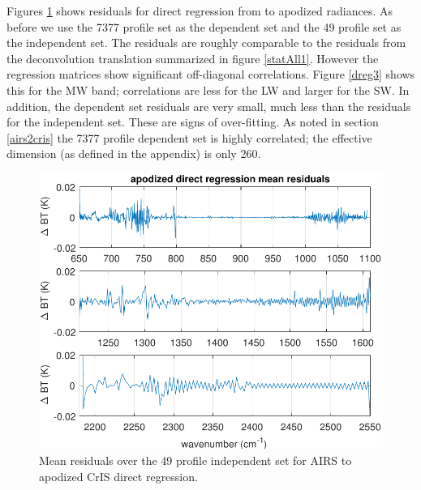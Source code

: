 \documentclass[journal]{IEEEtran}
\begin{document}

Figures \ref{dreg1} shows residuals for direct regression from
{\airs} to apodized {\cris} radiances.  As before we use the 7377
profile set as the dependent set and the 49 profile set as the
independent set.  The residuals are roughly comparable to the
residuals from the deconvolution translation summarized in figure
\ref{statAll1}.  However the regression matrices show significant
off-diagonal correlations.  Figure \ref{dreg3} shows this for the 
MW band; correlations are less for the LW and larger for the SW.  
In addition, the dependent set residuals are very small, much less
than the residuals for the independent set.  These are signs of
over-fitting.  As noted in section \ref{airs2cris} the 7377 profile
dependent set is highly correlated; the effective dimension (as
defined in the appendix) is only 260.


\begin{figure} %
  \centering
  \includegraphics[width=\linewidth]{figures/ap_dir_regr.pdf}
  \caption{Mean residuals over the 49 profile independent set for
    AIRS to apodized CrIS direct regression.}
  \label{dreg1}
\end{figure}
\end{document}
